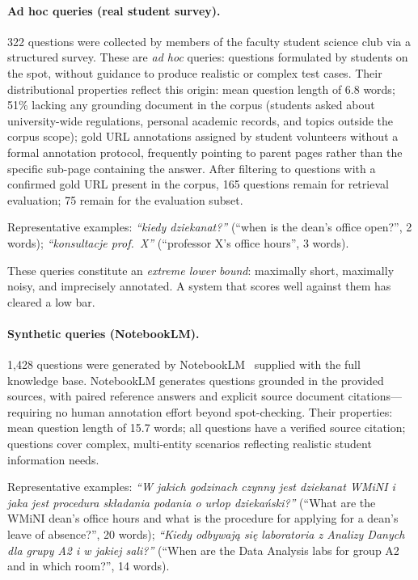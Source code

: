 \documentclass[sigconf,natbib=true]{acmart}
\begin{document}
\paragraph{Ad hoc queries (real student survey).}
322 questions were collected by members of the faculty student science club via a structured survey.
These are \emph{ad hoc} queries: questions formulated by students on the spot, without guidance to produce realistic or complex test cases.
Their distributional properties reflect this origin:
mean question length of 6.8 words; 51\% lacking any grounding document in the corpus (students asked about university-wide regulations, personal academic records, and topics outside the corpus scope); gold URL annotations assigned by student volunteers without a formal annotation protocol, frequently pointing to parent pages rather than the specific sub-page containing the answer.
After filtering to questions with a confirmed gold URL present in the corpus, 165 questions remain for retrieval evaluation; 75 remain for the evaluation subset.

Representative examples: \textit{``kiedy dziekanat?''} (``when is the dean's office open?'', 2 words); \textit{``konsultacje prof.\ X''} (``professor X's office hours'', 3 words).

These queries constitute an \emph{extreme lower bound}: maximally short, maximally noisy, and imprecisely annotated.
A system that scores well against them has cleared a low bar.

\paragraph{Synthetic queries (NotebookLM).}
1{,}428 questions were generated by NotebookLM~\cite{notebooklm2024} supplied with the full knowledge base.
NotebookLM generates questions grounded in the provided sources, with paired reference answers and explicit source document citations---requiring no human annotation effort beyond spot-checking.
Their properties: mean question length of 15.7 words; all questions have a verified source citation; questions cover complex, multi-entity scenarios reflecting realistic student information needs.

Representative examples: \textit{``W jakich godzinach czynny jest dziekanat WMiNI i jaka jest procedura składania podania o urlop dziekański?''} (``What are the WMiNI dean's office hours and what is the procedure for applying for a dean's leave of absence?'', 20 words); \textit{``Kiedy odbywają się laboratoria z Analizy Danych dla grupy A2 i w jakiej sali?''} (``When are the Data Analysis labs for group A2 and in which room?'', 14 words).
\end{document}
